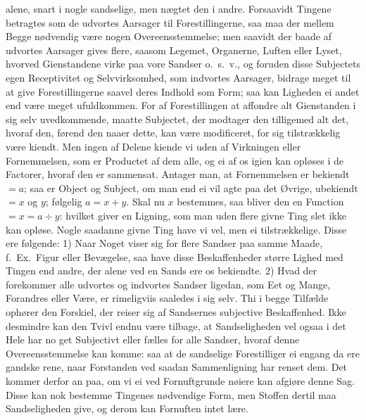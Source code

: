 \documentclass[12pt,a4paper]{article}
\newcommand{\opage}[1]{\marginnote{\footnotesize\textit{[#1]}}}
\begin{document}
alene, snart i nogle sandselige, men nægtet den i andre. Forsaavidt Tingene
betragtes som de udvortes Aarsager til Forestillingerne, saa maa der mellem Begge
nødvendig være nogen Overeensstemmelse; men saavidt der baade af udvortes Aarsager
gives flere, saasom Legemet, Organerne, Luften eller Lyset, hvorved Gienstandene
virke paa vore Sandser o.~s.~v., og foruden disse Subjectets egen Receptivitet og
Selvvirksomhed, som indvortes Aarsager, bidrage meget til
\opage{42} at give Forestillingerne saavel deres Indhold som Form; saa kan Ligheden ei andet end
være meget ufuldkommen. For af Forestillingen at affondre alt Gienstanden i sig selv
uvedkommende, maatte Subjectet, der modtager den tilligemed alt det, hvoraf den,
førend den naaer dette, kan være modificeret, for sig tilstrækkelig være kiendt. Men
ingen af Delene kiende vi uden af Virkningen eller Fornemmelsen, som er Productet af
dem alle, og ei af os igien kan opløses i de Factorer, hvoraf den er sammensat.
Antager man, at Fornemmelsen er bekiendt $= a$; saa er Object og Subject, om man end
ei vil agte paa det Øvrige, ubekiendt $= x$ og $y$; følgelig $a = x + y$. Skal nu $x$
bestemmes, saa bliver den en Function $= x = a \div y$: hvilket giver en Ligning, som
man uden flere givne Ting slet ikke kan opløse.
Nogle saadanne givne Ting have vi vel, men ei tilstrækkelige. Disse ere følgende: 1)
Naar Noget viser sig for flere Sandser paa samme Maade, f.~Ex.\ Figur eller
Bevægelse, saa have disse Beskaffenheder større Lighed med Tingen end andre, der
alene ved en Sands ere os bekiendte. 2) Hvad der forekommer alle udvortes og
indvortes Sandser ligedan, som Eet og Mange, Forandres eller Være, er rimeligviis
saaledes i sig selv. Thi i begge Tilfælde ophører den Forskiel, der reiser sig af
Sandsernes subjective Beskaffenhed. Ikke desmindre kan den Tvivl endnu være tilbage,
at Sandseligheden vel ogsaa i det Hele har no%
\opage{43}get Subjectivt eller fælles for alle Sandser, hvoraf denne Overeensstemmelse kan
komme: saa at de sandselige Forestilliger ei engang da ere gandske rene, naar
Forstanden ved saadan Sammenligning har renset dem.
Det kommer derfor an paa, om vi ei ved Fornuftgrunde nøiere kan afgiøre denne Sag.
Disse kan nok bestemme Tingenes nødvendige Form, men Stoffen dertil maa
Sandseligheden give, og derom kan Fornuften intet lære.
\end{document}
